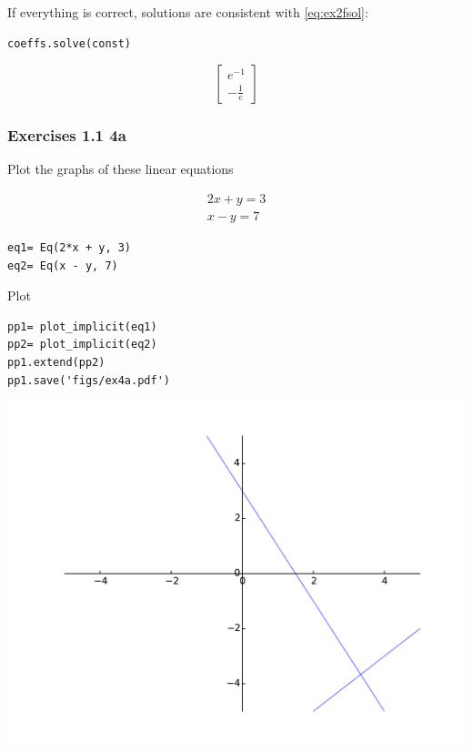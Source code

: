 If everything is correct, solutions are consistent with \ref{eq:ex2fsol}:

\begin{verbatim}
coeffs.solve(const)
\end{verbatim}

\begin{equation}
\left[\begin{matrix}e^{-1}\\- \frac{1}{e}\end{matrix}\right]
\end{equation}

\subsubsection{Exercises 1.1 4a}
Plot the graphs of these linear equations

\begin{equation}\label{eq:na}
\begin{matrix}2 x + y = 3\\x - y = 7\end{matrix}
\end{equation}

\begin{verbatim}
eq1= Eq(2*x + y, 3)
eq2= Eq(x - y, 7)
\end{verbatim}

Plot

\begin{verbatim}
pp1= plot_implicit(eq1)
pp2= plot_implicit(eq2)
pp1.extend(pp2)
pp1.save('figs/ex4a.pdf')
\end{verbatim}

\includegraphics[width=\linewidth]{figs/ex4a.pdf}


